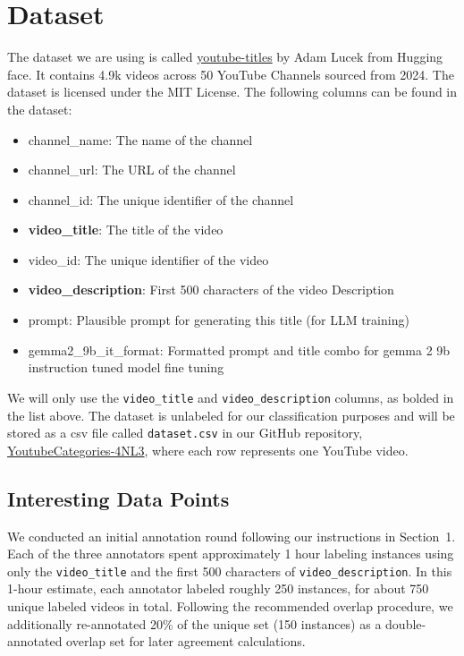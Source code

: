 \documentclass[11pt]{article}
\begin{document}
\section{Dataset}
The dataset we are using is called \href{https://huggingface.co/datasets/AdamLucek/youtube-titles}{youtube-titles} by Adam Lucek from Hugging face. It contains 4.9k videos across 50 YouTube Channels sourced from 2024. The dataset is licensed under the MIT License.
The following columns can be found in the dataset:
\begin{itemize}
  \item channel\_name: The name of the channel
  \item channel\_url: The URL of the channel
  \item channel\_id: The unique identifier of the channel
  \item \textbf{video\_title}: The title of the video
  \item video\_id: The unique identifier of the video
  \item \textbf{video\_description}: First 500 characters of the video Description
  \item prompt: Plausible prompt for generating this title (for LLM training)
  \item gemma2\_9b\_it\_format: Formatted prompt and title combo for gemma 2 9b instruction tuned model fine tuning
\end{itemize}
We will only use the \texttt{video\_title} and \texttt{video\_description} columns, as bolded in the list above.
The dataset is unlabeled for our classification purposes and will be stored as a csv file called \texttt{dataset.csv} in our GitHub repository, \href{https://github.com/thaafei/YouTubeCategories-4NL3}{YoutubeCategories-4NL3}, where each row represents one YouTube video.

\subsection{Interesting Data Points}

We conducted an initial annotation round following our instructions in Section~1. Each of the three annotators spent 
approximately 1 hour labeling instances using only the \texttt{video\_title} and the first 500 characters of 
\texttt{video\_description}. In this 1-hour estimate, each annotator labeled roughly 250 instances, for about 
750 unique labeled videos in total. Following the recommended overlap procedure, we additionally re-annotated 
20\% of the unique set (150 instances) as a double-annotated overlap set for later agreement calculations.
\end{document}
